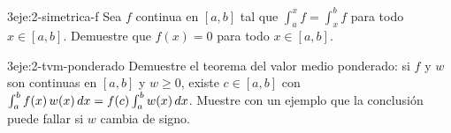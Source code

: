 \begin{ejercicio}{3}{eje:2-simetrica-f}
Sea $f$ continua en $[a,b]$ tal que $\int_a^{x}f=\int_x^{b}f$ para todo $x\in[a,b]$. Demuestre que $f(x)=0$ para todo $x\in[a,b]$.
\end{ejercicio}

\begin{ejercicio}{3}{eje:2-tvm-ponderado}
Demuestre el teorema del valor medio ponderado: si $f$ y $w$ son continuas en $[a,b]$ y $w\ge0$, existe $c\in[a,b]$ con $\int_a^bf(x)\,w(x)\mathop{}\!d x=f(c)\int_a^bw(x)\mathop{}\!d x$. Muestre con un ejemplo que la conclusión puede fallar si $w$ cambia de signo.
\end{ejercicio}
